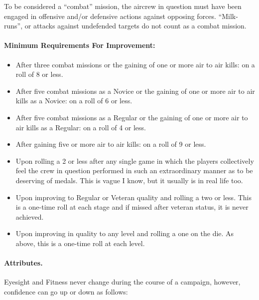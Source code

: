\begin{advancedrules}
{To be considered a “combat” mission, the aircrew in question must have been engaged in offensive and/or defensive actions against opposing forces. “Milk-runs”, or attacks against undefended targets do not count as a combat mission.

\paragraph{Minimum Requirements For Improvement:}

\begin{itemize}

    \item {} After three combat missions or the gaining of one or more air to air kills: on a roll of 8 or less.

    \item {} After five combat missions as a Novice or the gaining of one or more air to air kills as a Novice: on a roll of 6 or less.

    \item {} After five combat missions as a Regular or the gaining of one or more air to air kills as a Regular: on a roll of 4 or less.

    \item {} After gaining five or more air to air kills: on a roll of 9 or less.

    \item {} Upon rolling a 2 or less after any single game in which the players collectively feel the crew in question performed in such an extraordinary manner as to be deserving of medals. This is vague I know, but it usually is in real life too.

    \item {} Upon improving to Regular or Veteran quality and rolling a two or less. This is a one-time roll at each stage and if missed after veteran status, it is never achieved.

    \item {} Upon improving in quality to any level and rolling a one on the die. As above, this is a one-time roll at each level.
    
\end{itemize}

\paragraph{Attributes.} Eyesight and Fitness never change during the course of a campaign, however, confidence can go up or down as follows:
\begin{itemize}


\end{itemize}}
\end{advancedrules}
